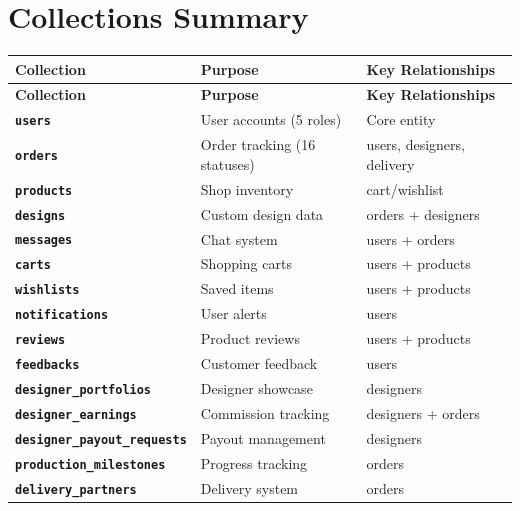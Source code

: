 \documentclass[a4paper,11pt]{article}
\newcommand{\coll}[1]{\textcolor{primary}{\texttt{\textbf{#1}}}}
\begin{document}
\section{Collections Summary}

\begin{longtable}{@{}L{4.8cm}L{4.5cm}L{4.7cm}@{}}
\toprule
{}
\textbf{Collection} & \textbf{Purpose} & \textbf{Key Relationships} \\
\midrule
\endfirsthead
\toprule
{}
\textbf{Collection} & \textbf{Purpose} & \textbf{Key Relationships} \\
\midrule
\endhead
\bottomrule
\endlastfoot
\coll{users}                      & User accounts (5 roles)      & Core entity \\
\coll{orders}                     & Order tracking (16 statuses) & users, designers, delivery \\
\coll{products}                   & Shop inventory               & cart/wishlist \\
\coll{designs}                    & Custom design data           & orders + designers \\
\coll{messages}                   & Chat system                  & users + orders \\
\coll{carts}                      & Shopping carts               & users + products \\
\coll{wishlists}                  & Saved items                  & users + products \\
\coll{notifications}              & User alerts                  & users \\
\coll{reviews}                    & Product reviews              & users + products \\
\coll{feedbacks}                  & Customer feedback            & users \\
\coll{designer\_portfolios}       & Designer showcase            & designers \\
\coll{designer\_earnings}         & Commission tracking          & designers + orders \\
\coll{designer\_payout\_requests} & Payout management            & designers \\
\coll{production\_milestones}     & Progress tracking            & orders \\
\coll{delivery\_partners}         & Delivery system              & orders \\
\end{longtable}
\end{document}
